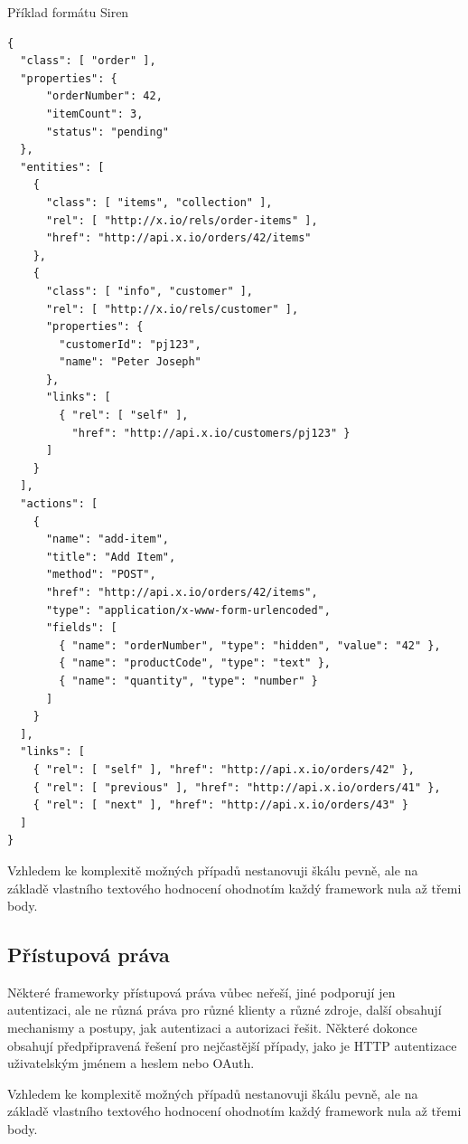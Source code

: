 \begin{listing}[htbp]
\caption{{\label{code:siren}Příklad formátu Siren \autocite{siren}}}
\begin{verbatim}
{
  "class": [ "order" ],
  "properties": {
      "orderNumber": 42,
      "itemCount": 3,
      "status": "pending"
  },
  "entities": [
    {
      "class": [ "items", "collection" ],
      "rel": [ "http://x.io/rels/order-items" ],
      "href": "http://api.x.io/orders/42/items"
    },
    {
      "class": [ "info", "customer" ],
      "rel": [ "http://x.io/rels/customer" ],
      "properties": {
        "customerId": "pj123",
        "name": "Peter Joseph"
      },
      "links": [
        { "rel": [ "self" ],
          "href": "http://api.x.io/customers/pj123" }
      ]
    }
  ],
  "actions": [
    {
      "name": "add-item",
      "title": "Add Item",
      "method": "POST",
      "href": "http://api.x.io/orders/42/items",
      "type": "application/x-www-form-urlencoded",
      "fields": [
        { "name": "orderNumber", "type": "hidden", "value": "42" },
        { "name": "productCode", "type": "text" },
        { "name": "quantity", "type": "number" }
      ]
    }
  ],
  "links": [
    { "rel": [ "self" ], "href": "http://api.x.io/orders/42" },
    { "rel": [ "previous" ], "href": "http://api.x.io/orders/41" },
    { "rel": [ "next" ], "href": "http://api.x.io/orders/43" }
  ]
}
\end{verbatim}
\end{listing}

Vzhledem ke komplexitě možných případů nestanovuji škálu pevně, ale na základě vlastního textového hodnocení ohodnotím každý framework nula až třemi body.

\subsection{Přístupová práva}\label{pux159uxedstupovuxe1-pruxe1va}

Některé frameworky přístupová práva vůbec neřeší, jiné podporují jen autentizaci, ale ne různá práva pro různé klienty a různé zdroje, další obsahují mechanismy a postupy, jak autentizaci a autorizaci řešit. Některé dokonce obsahují předpřipravená řešení pro nejčastější případy, jako je HTTP autentizace uživatelským jménem a heslem nebo OAuth.

Vzhledem ke komplexitě možných případů nestanovuji škálu pevně, ale na základě vlastního textového hodnocení ohodnotím každý framework nula až třemi body.

